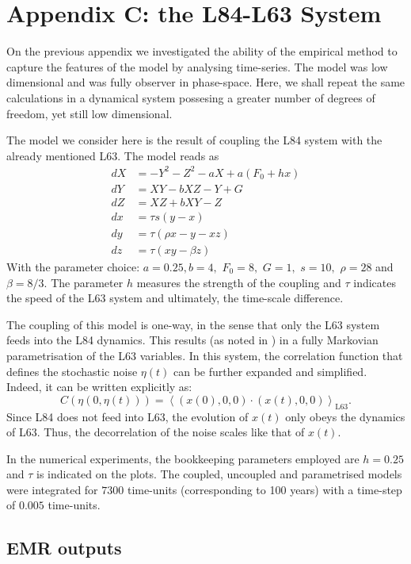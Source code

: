 \documentclass[12pt]{article}
\begin{document}
\section*{Appendix C: the L84-L63 System}

On the previous appendix we investigated the ability of the empirical method to capture the features of the model by analysing time-series. The model was low dimensional and was fully observer in phase-space. Here, we shall repeat the same calculations in a dynamical system possesing a greater number of degrees of freedom, yet still low dimensional. 

The model we consider here is the result of coupling the L84 system \cite{Lorenz1984a} with the already mentioned L63. The model reads as
\begin{align}
dX&=-Y^2-Z^2-aX+a(F_0 + hx)\\
dY&=XY - bXZ - Y +G \\
dZ&=XZ+bXY-Z\\
dx&=\tau s (y-x)\\
dy&=\tau (\rho x - y -xz)\\
dz&=\tau (xy-\beta z)
\end{align}
With the parameter choice: $a=0.25,b=4,$ $F_0=8,$ $G=1,$ $s=10,$ $\rho = 28$ and $\beta =8/3$. The parameter $h$ measures the strength of the coupling and $\tau$ indicates the speed of the L63 system and ultimately, the time-scale difference.

The coupling of this model is one-way, in the sense that only the L63 system feeds into the L84 dynamics. This results (as noted in \cite{Vissio2018b}) in a fully Markovian parametrisation of the L63 variables. In this system, the correlation function that defines the stochastic noise $\eta(t)$ can be further expanded and simplified. Indeed, it can be written explicitly as:
\begin{equation}
C(\eta (0,\eta(t)))=\left \langle (x(0),0,0)\cdot (x(t),0,0) \right \rangle _{\mathrm{L63}}.
\end{equation}
Since L84 does not feed into L63, the evolution of $x(t)$ only obeys the dynamics of L63. Thus, the decorrelation of the noise scales like that of $x(t)$. 

In the numerical experiments, the bookkeeping parameters employed are $h=0.25$ and $\tau$ is indicated on the plots. The coupled, uncoupled and parametrised models were integrated for $7300$ time-units (corresponding to 100 years) with a time-step of $0.005$ time-units.


\subsection{EMR outputs}
\end{document}
